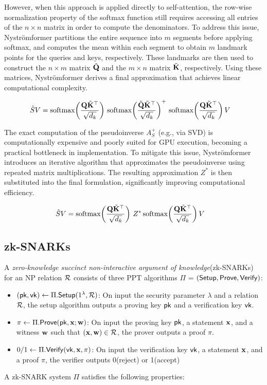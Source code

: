 \documentclass[letterpaper,twocolumn,10pt]{article}
\begin{document}
However, when this approach is applied directly to self-attention, the row-wise normalization property of the softmax function still requires accessing all entries of the $n \times n$ matrix in order to compute the denominators. To address this issue, Nyströmformer partitions the entire sequence into $m$ segments before applying softmax, and computes the mean within each segment to obtain $m$ landmark points for the queries and keys, respectively. These landmarks are then used to construct the $n \times m$ matrix $\tilde{{\mathbf{Q}}}$ and the $m \times n$ matrix $\tilde{{\mathbf{K}}}$, respectively.
Using these matrices, Nyströmformer derives a final approximation that achieves linear computational complexity.

\begin{align*}
\hat S V &= 
{\mathrm{softmax}}\!\left(\frac{{\mathbf{Q}}\tilde {{\mathbf{K}}}^{\top}}{\sqrt{d_k}}\right)
\,
{\mathrm{softmax}}\!\left(\frac{\tilde {{\mathbf{Q}}} \tilde {{\mathbf{K}}}^{\top}}{\sqrt{d_k}}\right)^{+}
\,
{\mathrm{softmax}}\!\left(\frac{{\mathbf{Q}}\tilde {{\mathbf{K}}}^{\top}}{\sqrt{d_k}}\right)V
\end{align*}

The exact computation of the pseudoinverse $A_S^{+}$ (e.g., via SVD) is computationally expensive and poorly suited for GPU execution, becoming a practical bottleneck in implementation. To mitigate this issue, Nyströmformer introduces an iterative algorithm that approximates the pseudoinverse using repeated matrix multiplications. The resulting approximation $Z^*$ is then substituted into the final formulation, significantly improving computational efficiency.

\begin{align*}
\hat S V &= {\mathrm{softmax}}\!\left(\frac{{\mathbf{Q}}\tilde {{\mathbf{K}}}^{\top}}{\sqrt{d_k}}\right)\, Z^* \,
{\mathrm{softmax}}\!\left(\frac{{\mathbf{Q}}\tilde {{\mathbf{K}}}^{\top}}{\sqrt{d_k}}\right)V
\end{align*}

\subsection{zk-SNARKs}
A \textit{zero-knowledge succinct non-interactive argument of knowledge}(zk-SNARKs) for an NP relation ${\mathcal{R}}$ consists of three PPT algorithms $\Pi$ = $({\sf Setup}, {\sf Prove}, {\sf Verify})$:
\begin{itemize}
    \item $({\sf pk}, {\sf vk}) \gets \Pi.{\sf Setup}(1^\lambda, {\mathcal{R}})$: On input the security parameter $\lambda$ and a relation ${\mathcal{R}}$, the setup algorithm outputs a proving key ${\sf pk}$ and a verification key ${\sf vk}$.
    \item $\pi \gets \Pi.{\sf Prove}({\sf pk}, {\mathbf{x}}; {\mathbf{w}})$: On input the proving key ${\sf pk}$, a statement ${\mathbf{x}}$, and a witness ${\mathbf{w}}$ such that $({\mathbf{x}}, {\mathbf{w}}) \in {\mathcal{R}}$, the prover outputs a proof $\pi$.
    \item $0/1 \gets \Pi.{\sf Verify}({\sf vk}, {\mathbf{x}}, \pi)$: On input the verification key ${\sf vk}$, a statement ${\mathbf{x}}$, and a proof $\pi$, the verifier outputs 0(reject) or 1(accept)
\end{itemize}
A zk-SNARK system $\Pi$ satisfies the following properties:
\end{document}
